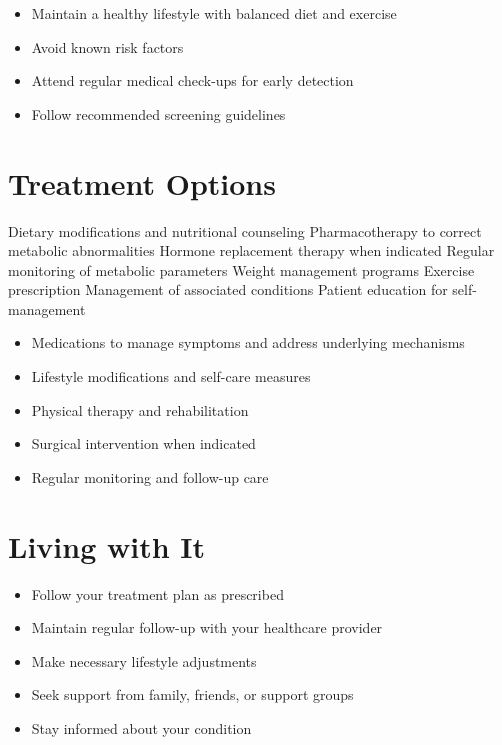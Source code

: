 \begin{itemize}[noitemsep]
  \item Maintain a healthy lifestyle with balanced diet and exercise
  \item Avoid known risk factors
  \item Attend regular medical check-ups for early detection
  \item Follow recommended screening guidelines
\end{itemize}
\section{Treatment Options}
Dietary modifications and nutritional counseling Pharmacotherapy to correct metabolic abnormalities Hormone replacement therapy when indicated Regular monitoring of metabolic parameters Weight management programs Exercise prescription Management of associated conditions Patient education for self-management

\begin{itemize}[noitemsep]
  \item Medications to manage symptoms and address underlying mechanisms
  \item Lifestyle modifications and self-care measures
  \item Physical therapy and rehabilitation
  \item Surgical intervention when indicated
  \item Regular monitoring and follow-up care
\end{itemize}
\section{Living with It}
\begin{itemize}[noitemsep]
  \item Follow your treatment plan as prescribed
  \item Maintain regular follow-up with your healthcare provider
  \item Make necessary lifestyle adjustments
  \item Seek support from family, friends, or support groups
  \item Stay informed about your condition
\end{itemize}
